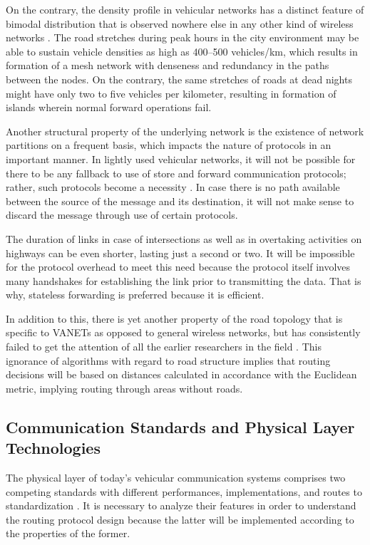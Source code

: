 \documentclass[12pt]{article}
\begin{document}
On the contrary, the density profile in vehicular networks has a distinct feature of bimodal distribution that is observed nowhere else in any other kind of wireless networks \cite{vegni2015survey}. The road stretches during peak hours in the city environment may be able to sustain vehicle densities as high as 400–500 vehicles/km, which results in formation of a mesh network with denseness and redundancy in the paths between the nodes. On the contrary, the same stretches of roads at dead nights might have only two to five vehicles per kilometer, resulting in formation of islands wherein normal forward operations fail.

Another structural property of the underlying network is the existence of network partitions on a frequent basis, which impacts the nature of protocols in an important manner. In lightly used vehicular networks, it will not be possible for there to be any fallback to use of store and forward communication protocols; rather, such protocols become a necessity \cite{vegni2015survey}. In case there is no path available between the source of the message and its destination, it will not make sense to discard the message through use of certain protocols.

The duration of links in case of intersections as well as in overtaking activities on highways can be even shorter, lasting just a second or two. It will be impossible for the protocol overhead to meet this need because the protocol itself involves many handshakes for establishing the link prior to transmitting the data. That is why, stateless forwarding is preferred because it is efficient.

In addition to this, there is yet another property of the road topology that is specific to VANETs as opposed to general wireless networks, but has consistently failed to get the attention of all the earlier researchers in the field \cite{nzouonta2009vanet}. This ignorance of algorithms with regard to road structure implies that routing decisions will be based on distances calculated in accordance with the Euclidean metric, implying routing through areas without roads.

\subsection{Communication Standards and Physical Layer Technologies}

The physical layer of today’s vehicular communication systems comprises two competing standards with different performances, implementations, and routes to standardization \cite{karagiannis2011vehicular}. It is necessary to analyze their features in order to understand the routing protocol design because the latter will be implemented according to the properties of the former.
\end{document}
